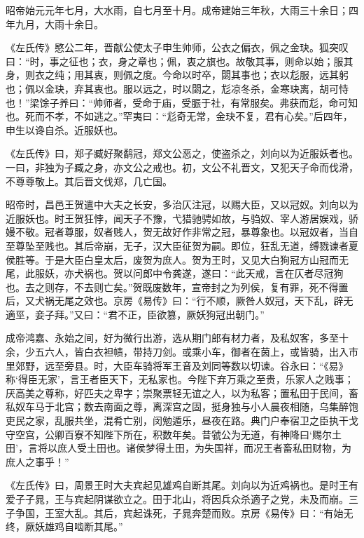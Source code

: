 \documentclass[12pt,UTF8]{ctexbook}
\begin{document}
昭帝始元元年七月，大水雨，自七月至十月。成帝建始三年秋，大雨三十余日；四年九月，大雨十余日。



《左氏传》愍公二年，晋献公使太子申生帅师，公衣之偏衣，佩之金玦。狐突叹曰：“时，事之征也；衣，身之章也；佩，衷之旗也。故敬其事，则命以始；服其身，则衣之纯；用其衷，则佩之度。今命以时卒，閟其事也；衣以尨服，远其躬也；佩以金玦，弃其衷也。服以远之，时以閟之，尨凉冬杀，金寒玦离，胡可恃也！”梁馀子养曰：“帅师者，受命于庙，受脤于社，有常服矣。弗获而尨，命可知也。死而不孝，不如逃之。”罕夷曰：“尨奇无常，金玦不复，君有心矣。”后四年，申生以谗自杀。近服妖也。



《左氏传》曰，郑子臧好聚鹬冠，郑文公恶之，使盗杀之，刘向以为近服妖者也。一曰，非独为子臧之身，亦文公之戒也。初，文公不礼晋文，又犯天子命而伐滑，不尊尊敬上。其后晋文伐郑，几亡国。



昭帝时，昌邑王贺遣中大夫之长安，多治仄注冠，以赐大臣，又以冠奴。刘向以为近服妖也。时王贺狂悖，闻天子不豫，弋猎驰骋如故，与驺奴、宰人游居娱戏，骄嫚不敬。冠者尊服，奴者贱人，贺无故好作非常之冠，暴尊象也。以冠奴者，当自至尊坠至贱也。其后帝崩，无子，汉大臣征贺为嗣。即位，狂乱无道，缚戮谏者夏侯胜等。于是大臣白皇太后，废贺为庶人。贺为王时，又见大白狗冠方山冠而无尾，此服妖，亦犬祸也。贺以问郎中令龚遂，遂曰：“此天戒，言在仄者尽冠狗也。去之则存，不去则亡矣。”贺既废数年，宣帝封之为列侯，复有罪，死不得置后，又犬祸无尾之效也。京房《易传》曰：“行不顺，厥咎人奴冠，天下乱，辟无適巠，妾子拜。”又曰：“君不正，臣欲篡，厥妖狗冠出朝门。”



成帝鸿嘉、永始之间，好为微行出游，选从期门郎有材力者，及私奴客，多至十余，少五六人，皆白衣袒帻，带持刀剑。或乘小车，御者在茵上，或皆骑，出入市里郊野，远至旁县。时，大臣车骑将军王音及刘同等数以切谏。谷永曰：“《易》称‘得臣无家’，言王者臣天下，无私家也。今陛下弃万乘之至贵，乐家人之贱事；厌高美之尊称，好匹夫之卑字；崇聚票轻无谊之人，以为私客；置私田于民间，畜私奴车马于北宫；数去南面之尊，离深宫之固，挺身独与小人晨夜相随，乌集醉饱吏民之家，乱服共坐，混肴亡别，闵勉遁乐，昼夜在路。典门户奉宿卫之臣执干戈守空宫，公卿百寮不知陛下所在，积数年矣。昔虢公为无道，有神降曰‘赐尔土田’，言将以庶人受土田也。诸侯梦得土田，为失国祥，而况王者畜私田财物，为庶人之事乎！”



《左氏传》曰，周景王时大夫宾起见雄鸡自断其尾。刘向以为近鸡祸也。是时王有爱子子晁，王与宾起阴谋欲立之。田于北山，将因兵众杀適子之党，未及而崩。三子争国，王室大乱。其后，宾起诛死，子晁奔楚而败。京房《易传》曰：“有始无终，厥妖雄鸡自啮断其尾。”
\end{document}
